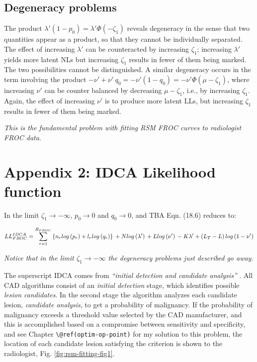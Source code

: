 \documentclass[
]{book}
\begin{document}
\hypertarget{rsm-fitting-froc-degeneracy}{%
\subsection{Degeneracy problems}\label{rsm-fitting-froc-degeneracy}}

The product \(\lambda' \left ( 1-p_0 \right ) = \lambda'\Phi(-\zeta_1)\) reveals degeneracy in the sense that two quantities appear as a product, so that they cannot be individually separated. The effect of increasing \(\lambda'\) can be counteracted by increasing \(\zeta_1\); increasing \(\lambda'\) yields more latent NLs but increasing \(\zeta_1\) results in fewer of them being marked. The two possibilities cannot be distinguished. A similar degeneracy occurs in the term involving the product \(-\nu' + \nu' \ q_0 = -\nu'(1- q_0) = -\nu' \Phi(\mu-\zeta_1)\), where increasing \(\nu'\) can be counter balanced by decreasing \(\mu-\zeta_1\), i.e., by increasing \(\zeta_1\). Again, the effect of increasing \(\nu'\) is to produce more latent LLs, but increasing \(\zeta_1\) results in fewer of them being marked.

\emph{This is the fundamental problem with fitting RSM FROC curves to radiologist FROC data.}

\hypertarget{rsm-fitting-froc-idca}{%
\section{Appendix 2: IDCA Likelihood function}\label{rsm-fitting-froc-idca}}

In the limit \(\zeta_1 \rightarrow -\infty\), \(p_0 \rightarrow 0\) and \(q_0 \rightarrow 0\), and TBA Eqn. (18.6) reduces to:

\begin{equation}
LL_{FROC}^{IDCA} = \sum_{r=1}^{R_{FROC}} \left \{ n_r log\left ( p_r \right ) + l_r log\left ( q_r \right ) \right \} \\
+ N log\left ( \lambda' \right ) \\
+ L log\left ( \nu' \right ) \\
- K \lambda'  \\
+ \left ( L_T - L \right ) log \left ( 1 - \nu'  \right )
\label{eq:rsm-fitting-idca-ll}
\end{equation}

\emph{Notice that in the limit \(\zeta_1 \rightarrow -\infty\) the degeneracy problems just described go away.}

The superscript IDCA comes from \emph{``initial detection and candidate analysis''} \citep{edwards2002maximum}. All CAD algorithms consist of an \emph{initial detection} stage, which identifies possible \emph{lesion candidates}. In the second stage the algorithm analyzes each candidate lesion, \emph{candidate analysis}, to get a probability of malignancy. If the probability of malignancy exceeds a threshold value selected by the CAD manufacturer, and this is accomplished based on a compromise between sensitivity and specificity, and see Chapter \texttt{\textbackslash{}@ref(optim-op-point)} for my solution to this problem, the location of each candidate lesion satisfying the criterion is shown to the radiologist, Fig. \ref{fig:rsm-fitting-fig1}.
\end{document}
